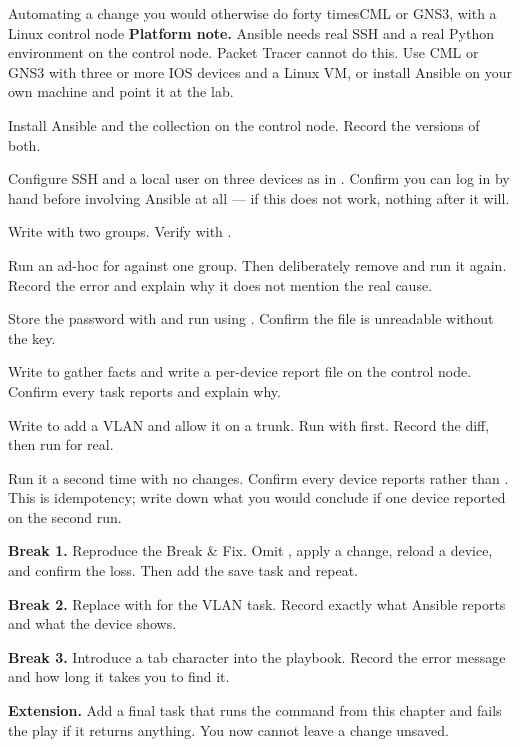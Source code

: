 \begin{lab}{Automating a change you would otherwise do forty times}{CML or GNS3, with a Linux control node}
\textbf{Platform note.} Ansible needs real SSH and a real Python environment on
the control node. Packet Tracer cannot do this. Use CML or GNS3 with three or
more IOS devices and a Linux VM, or install Ansible on your own machine and point
it at the lab.

\begin{tasks}
  \item Install Ansible and the  collection on the control node.
        Record the versions of both.
  \item Configure SSH and a local user on three devices as in .
        Confirm you can log in by hand before involving Ansible at all --- if
        this does not work, nothing after it will.
  \item Write  with two groups. Verify with
        .
  \item Run an ad-hoc  for  against one
        group. Then deliberately remove  and run it
        again. Record the error and explain why it does not mention the real
        cause.
  \item Store the password with  and run using
        . Confirm the file is unreadable without the key.
  \item Write  to gather facts and write a per-device report file
        on the control node. Confirm every task reports  and
        explain why.
  \item Write  to add a VLAN and allow it on a trunk. Run with
         first. Record the diff, then run for real.
  \item Run it a second time with no changes. Confirm every device reports
         rather than . This is idempotency; write down what
        you would conclude if one device reported  on the second
        run.
  \item \textbf{Break 1.} Reproduce the Break \& Fix. Omit ,
        apply a change, reload a device, and confirm the loss. Then add the save
        task and repeat.
  \item \textbf{Break 2.} Replace  with  for
        the VLAN task. Record exactly what Ansible reports and what the device
        shows.
  \item \textbf{Break 3.} Introduce a tab character into the playbook. Record the
        error message and how long it takes you to find it.
  \item \textbf{Extension.} Add a final task that runs the
         command from this chapter and fails
        the play if it returns anything. You now cannot leave a change unsaved.
\end{tasks}
\end{lab}

